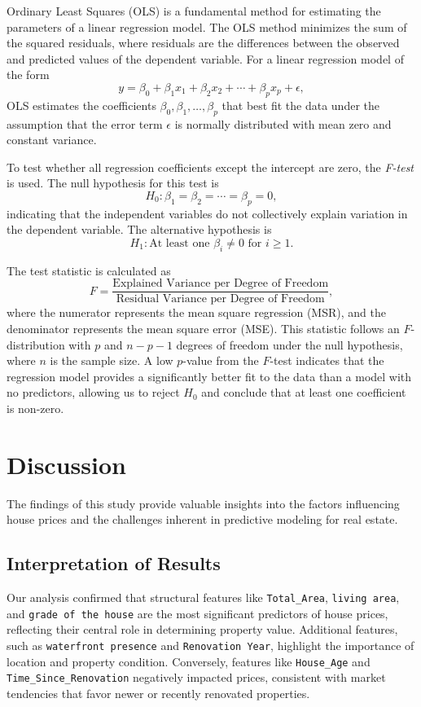 \documentclass[11pt]{article}
\begin{document}
Ordinary Least Squares (OLS) is a fundamental method for estimating the parameters of a linear regression model. The OLS method minimizes the sum of the squared residuals, where residuals are the differences between the observed and predicted values of the dependent variable. For a linear regression model of the form 
\[
y = \beta_0 + \beta_1 x_1 + \beta_2 x_2 + \cdots + \beta_p x_p + \epsilon,
\]
OLS estimates the coefficients \( \beta_0, \beta_1, \ldots, \beta_p \) that best fit the data under the assumption that the error term \( \epsilon \) is normally distributed with mean zero and constant variance.

To test whether all regression coefficients except the intercept are zero, the \textit{F-test} is used. The null hypothesis for this test is 
\[
H_0: \beta_1 = \beta_2 = \cdots = \beta_p = 0,
\]
indicating that the independent variables do not collectively explain variation in the dependent variable. The alternative hypothesis is 
\[
H_1: \text{At least one } \beta_i \neq 0 \text{ for } i \geq 1.
\]

The test statistic is calculated as 
\[
F = \frac{\text{Explained Variance per Degree of Freedom}}{\text{Residual Variance per Degree of Freedom}},
\]
where the numerator represents the mean square regression (MSR), and the denominator represents the mean square error (MSE). This statistic follows an \( F \)-distribution with \( p \) and \( n-p-1 \) degrees of freedom under the null hypothesis, where \( n \) is the sample size. A low \( p \)-value from the \( F \)-test indicates that the regression model provides a significantly better fit to the data than a model with no predictors, allowing us to reject \( H_0 \) and conclude that at least one coefficient is non-zero.

\section{Discussion}

The findings of this study provide valuable insights into the factors influencing house prices and the challenges inherent in predictive modeling for real estate. 

\subsection{Interpretation of Results}

Our analysis confirmed that structural features like \texttt{Total\_Area}, \texttt{living area}, and \texttt{grade of the house} are the most significant predictors of house prices, reflecting their central role in determining property value. Additional features, such as \texttt{waterfront presence} and \texttt{Renovation Year}, highlight the importance of location and property condition. Conversely, features like \texttt{House\_Age} and \texttt{Time\_Since\_Renovation} negatively impacted prices, consistent with market tendencies that favor newer or recently renovated properties.
\end{document}
